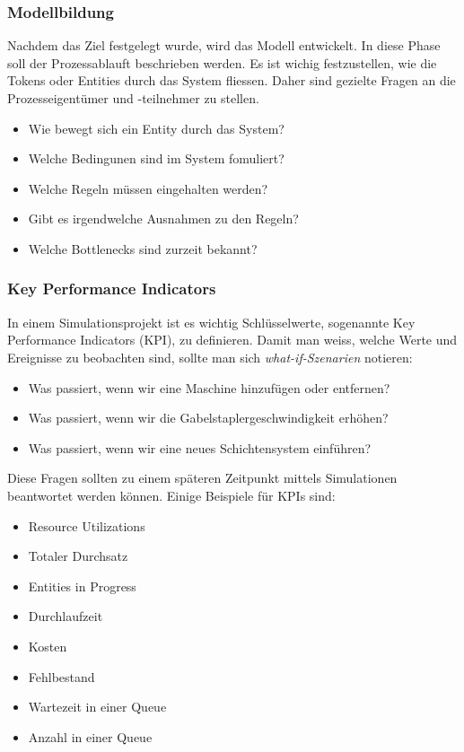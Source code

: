 \subsubsection{Modellbildung}
Nachdem das Ziel festgelegt wurde, wird das Modell entwickelt. In diese Phase soll der Prozessablauft beschrieben werden. Es ist wichig festzustellen, wie die Tokens oder Entities durch das System fliessen.
Daher sind gezielte Fragen an die Prozesseigentümer und -teilnehmer zu stellen. 
\begin{itemize}
    \item Wie bewegt sich ein Entity durch das System?
    \item Welche Bedingunen sind im System fomuliert?
    \item Welche Regeln müssen eingehalten werden?
    \item Gibt es irgendwelche Ausnahmen zu den Regeln? 
    \item Welche Bottlenecks sind zurzeit bekannt?
\end{itemize}


\subsubsection{Key Performance Indicators}
In einem Simulationsprojekt ist es wichtig Schlüsselwerte, sogenannte Key Performance Indicators (KPI), zu definieren. Damit man weiss, welche Werte und Ereignisse zu beobachten sind, sollte man sich \glqq \textit{what-if\grqq-Szenarien}  notieren:
\begin{itemize}
    \item Was passiert, wenn wir eine Maschine hinzufügen oder entfernen?
    \item Was passiert, wenn wir die Gabelstaplergeschwindigkeit erhöhen?
    \item Was passiert, wenn wir eine neues Schichtensystem einführen?
\end{itemize}
Diese Fragen sollten zu einem späteren Zeitpunkt mittels Simulationen beantwortet werden können.
\newline
\newline
Einige Beispiele für KPIs sind:
\begin{itemize}
    \item Resource Utilizations 
    \item Totaler Durchsatz
    \item Entities in Progress
    \item Durchlaufzeit
    \item Kosten
    \item Fehlbestand
    \item Wartezeit in einer Queue
    \item Anzahl in einer Queue
\end{itemize}

